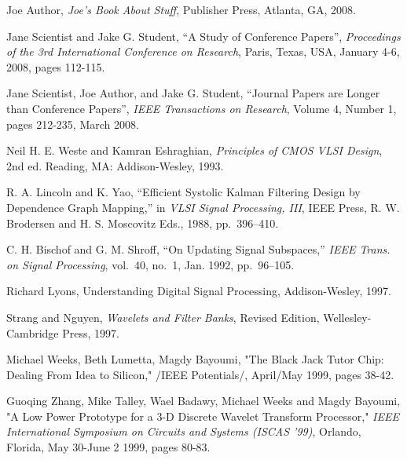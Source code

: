 \documentclass[final]{ieee}
\begin{document}



\begin{thebibliography}{99}

   Joe Author, {\it Joe's Book About Stuff}, Publisher Press,
  Atlanta, GA, 2008.
  
   Jane Scientist and Jake G. Student, 
   ``A Study of Conference Papers'', {\it Proceedings of the 3rd International
    Conference on Research}, Paris, Texas, USA, January 4-6, 2008, pages 112-115.
    
     Jane Scientist, Joe Author, and Jake G. Student,
    ``Journal Papers are Longer than Conference Papers'', 
    {\it IEEE Transactions on Research}, Volume 4, Number 1, pages 212-235,
    March 2008.
  
  
   Neil H. E. Weste and Kamran Eshraghian, {\it Principles
  of CMOS VLSI Design}, 2nd ed. Reading, MA: Addison-Wesley, 1993.

   R. A. Lincoln and K. Yao, ``Efficient Systolic Kalman
  Filtering Design by Dependence Graph Mapping,'' in {\it VLSI Signal
  Processing, III}, IEEE Press, R. W. Brodersen and H. S. Moscovitz Eds.,
  1988, pp.~396--410.

   C. H. Bischof and G. M. Shroff, ``On Updating Signal
  Subspaces,'' {\it IEEE Trans. on Signal Processing}, vol.~40, no.~1,
   Jan. 1992, pp.~96--105.

   Richard Lyons, {Understanding Digital Signal Processing},
Addison-Wesley, 1997.

   Strang and Nguyen, {\it Wavelets and Filter Banks}, Revised
Edition, Wellesley-Cambridge Press, 1997.

 Michael Weeks, Beth Lumetta, Magdy Bayoumi, "The Black Jack
Tutor Chip: Dealing From Idea to Silicon," /IEEE Potentials/, April/May
1999, pages 38-42.

 Guoqing Zhang, Mike Talley, Wael Badawy, Michael Weeks and
Magdy Bayoumi, "A Low Power Prototype for a 3-D Discrete Wavelet
Transform Processor," {\it IEEE International Symposium on Circuits and
Systems (ISCAS '99)}, Orlando, Florida, May 30-June 2 1999, pages 80-83.


\end{thebibliography}
\end{document}
